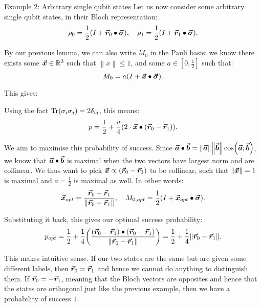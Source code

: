 \documentclass[a4paper]{article}
\begin{document}
\begin{parag}{Example 2: Arbitrary single qubit states}
    Let us now consider some arbitrary single qubit states, in their Bloch representation: 
    \[\rho_0 = \frac{1}{2}\left(I + \bvec{r}_0 \dotprod \bvec{\sigma}\right), \mathspace \rho_1 = \frac{1}{2}\left(I + \bvec{r}_1 \dotprod \bvec{\sigma}\right).\]

    By our previous lemma, we can also write $M_0$ in the Pauli basis: we know there exists some $\bm{\protect\vec{x}} \in \mathbb{R}^3$ such that $\left\|x\right\| \leq 1$, and some $a \in \left[0, \frac{1}{2}\right]$ such that: 
    \[M_0 = a\left(I + \bvec{x} \dotprod \bvec{\sigma}\right).\]
    
    This gives: 
    
    Using the fact $\Tr\left(\sigma_i \sigma_j\right) = 2 \delta_{ij}$, this means: 
    \[p = \frac{1}{2} + \frac{a}{4}\left(2\cdot \bvec{x} \dotprod \left(\bvec{r}_0 - \bvec{r}_1\right)\right).\]

    We aim to maximise this probability of success. Since $\bvec{a} \dotprod \bvec{b} = \left\|\bvec{a}\right\| \left\|\bvec{b}\right\| \cos\left(\bvec{a}; \bvec{b}\right)$, we know that $\bm{\protect\vec{a}} \bullet \bm{\protect\vec{b}}$ is maximal when the two vectors have largest norm and are collinear. We thus want to pick $\bvec{x} \propto \left(\bvec{r}_0 - \bvec{r}_1\right)$ to be collinear, such that $\left\|\bvec{x}\right\| = 1$ is maximal and $a = \frac{1}{2}$ is maximal as well. In other words:
    \[\bvec{x}_{opt} = \frac{\bvec{r}_0 - \bvec{r}_1}{\left\|\bvec{r}_0 - \bvec{r}_1\right\|}, \mathspace M_{0, opt} = \frac{1}{2}\left(I + \bvec{x}_{opt} \dotprod \bvec{\sigma}\right).\]
    
    Substituting it back, this gives our optimal success probability: 
    \[p_{opt} = \frac{1}{2} + \frac{1}{4} \left(\frac{\left(\bvec{r}_0 - \bvec{r}_1\right) \dotprod \left(\bvec{r}_0 - \bvec{r}_1\right)}{\left\|\bvec{r}_0 - \bvec{r}_1\right\|}\right) = \frac{1}{2} + \frac{1}{4} \left\|\bvec{r}_0 - \bvec{r}_1\right\|.\]
    
    This makes intuitive sense. If our two states are the same but are given some different labels, then $\bm{\protect\vec{r}}_0 = \bm{\protect\vec{r}}_1$ and hence we cannot do anything to distinguish them. If $\bm{\protect\vec{r}}_0 = -\bm{\protect\vec{r}}_1$, meaning that the Bloch vectors are opposites and hence that the states are orthogonal just like the previous example, then we have a probability of success $1$.
\end{parag}
\end{document}
